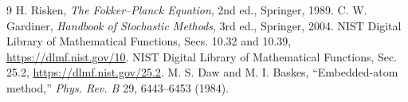 \documentclass[11pt,letterpaper]{article}
\begin{document}
\begin{thebibliography}{9}
 H. Risken, \emph{The Fokker--Planck Equation}, 2nd ed., Springer, 1989.
 C. W. Gardiner, \emph{Handbook of Stochastic Methods}, 3rd ed., Springer, 2004.
 NIST Digital Library of Mathematical Functions, Secs. 10.32 and 10.39, \url{https://dlmf.nist.gov/10}.
 NIST Digital Library of Mathematical Functions, Sec. 25.2, \url{https://dlmf.nist.gov/25.2}.
 M. S. Daw and M. I. Baskes, ``Embedded-atom method,'' \emph{Phys. Rev. B} 29, 6443--6453 (1984).
\end{thebibliography}
\end{document}
